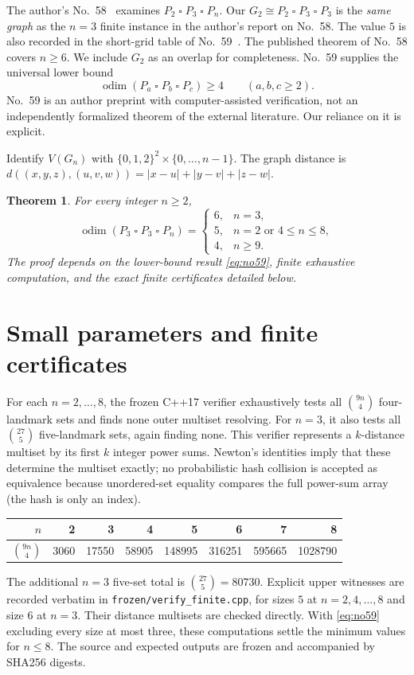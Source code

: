 \documentclass[10pt,a4paper]{article}
\newcommand{\odim}{\operatorname{odim}}
\newcommand{\sq}{\mathbin{\square}}
\newtheorem{theorem}{Theorem}
\begin{document}
The author's No.~58~\cite{Yonezu58} examines $P_2\sq P_3\sq P_n$.
Our $G_2\cong P_2\sq P_3\sq P_3$ is the \emph{same graph} as the $n=3$
finite instance in the author's report on No.~58. The value $5$ is
also recorded in the short-grid table of No.~59~\cite{Yonezu59}.
The published theorem of No.~58 covers $n\ge6$. We include $G_2$ as
an overlap for completeness. No.~59 supplies the universal lower bound
\begin{equation}\label{eq:no59}
  \odim(P_a\sq P_b\sq P_c)\ge4\qquad (a,b,c\ge2).
\end{equation}
No.~59 is an author preprint with computer-assisted verification, not an
independently formalized theorem of the external literature. Our reliance
on it is explicit.

Identify $V(G_n)$ with $\{0,1,2\}^2\times\{0,\ldots,n-1\}$.
The graph distance is $d((x,y,z),(u,v,w))=|x-u|+|y-v|+|z-w|$.

\begin{theorem}\label{thm:main}
For every integer $n\ge2$,
\[
 \odim(P_3\sq P_3\sq P_n)=
 \begin{cases}
 6,&n=3,\\
 5,&n=2\text{ or }4\le n\le8,\\
 4,&n\ge9.
 \end{cases}
\]
The proof depends on the lower-bound result \eqref{eq:no59}, finite
exhaustive computation, and the exact finite certificates detailed below.
\end{theorem}

\section{Small parameters and finite certificates}
For each $n=2,\ldots,8$, the frozen C++17 verifier exhaustively tests
all $\binom{9n}{4}$ four-landmark sets and finds none outer multiset
resolving. For $n=3$, it also tests all $\binom{27}{5}$ five-landmark
sets, again finding none. This verifier represents a $k$-distance multiset
by its first $k$ integer power sums. Newton's identities imply that
these determine the multiset exactly; no probabilistic hash collision is
accepted as equivalence because unordered-set equality compares the full
power-sum array (the hash is only an index).

\begin{center}\small
\begin{tabular}{@{}rrrrrrrr@{}}\toprule
$n$&2&3&4&5&6&7&8\\\midrule
$\binom{9n}{4}$&3060&17550&58905&148995&316251&595665&1028790\\
\bottomrule\end{tabular}
\end{center}
The additional $n=3$ five-set total is $\binom{27}{5}=80730$.
Explicit upper witnesses are recorded verbatim in
\texttt{frozen/verify\_finite.cpp}, for sizes $5$ at $n=2,4,\ldots,8$
and size $6$ at $n=3$. Their distance multisets are checked directly.
With \eqref{eq:no59} excluding every size at most three, these computations
settle the minimum values for $n\le8$. The source and expected outputs are
frozen and accompanied by SHA256 digests.
\end{document}
